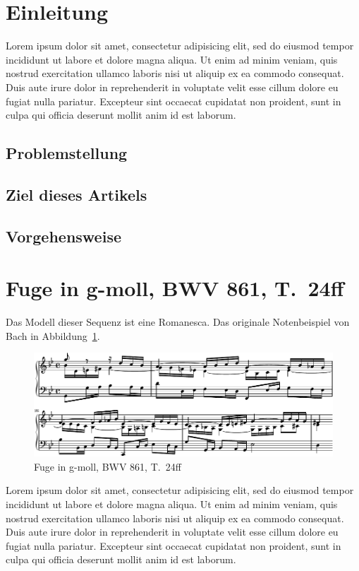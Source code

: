 \section{Einleitung}

Lorem ipsum dolor sit amet, consectetur adipisicing elit, sed do eiusmod tempor incididunt ut labore et dolore magna aliqua. Ut enim ad minim veniam, quis nostrud exercitation ullamco laboris nisi ut aliquip ex ea commodo consequat. Duis aute irure dolor in reprehenderit in voluptate velit esse cillum dolore eu fugiat nulla pariatur. Excepteur sint occaecat cupidatat non proident, sunt in culpa qui officia deserunt mollit anim id est laborum.

\subsection{Problemstellung}

\subsection{Ziel dieses Artikels}

\subsection{Vorgehensweise}

\section{Fuge in g-moll, BWV 861, T.~24ff}

Das Modell dieser Sequenz ist eine Romanesca. Das originale Notenbeispiel von Bach in Abbildung~\ref{fig:bwv681-original}.

\begin{figure}[htbp]
	\centering
	\includegraphics{lilypond/g-moll/render/original}
	\caption{Fuge in g-moll, BWV 861, T.~24ff}
	\label{fig:bwv681-original}
\end{figure}

Lorem ipsum dolor sit amet, consectetur adipisicing elit, sed do eiusmod tempor incididunt ut labore et dolore magna aliqua. Ut enim ad minim veniam, quis nostrud exercitation ullamco laboris nisi ut aliquip ex ea commodo consequat. Duis aute irure dolor in reprehenderit in voluptate velit esse cillum dolore eu fugiat nulla pariatur. Excepteur sint occaecat cupidatat non proident, sunt in culpa qui officia deserunt mollit anim id est laborum.
